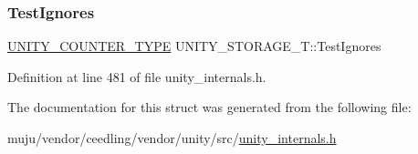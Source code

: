 \mbox{\label{struct_u_n_i_t_y___s_t_o_r_a_g_e___t_ab0ea61a39989b54885e805e6a35ff300}} 
\subsubsection{\texorpdfstring{Test\+Ignores}{TestIgnores}}
{\footnotesize\ttfamily \hyperlink{unity__internals_8h_ab5186738706785ae0189b382e45911d9}{U\+N\+I\+T\+Y\+\_\+\+C\+O\+U\+N\+T\+E\+R\+\_\+\+T\+Y\+PE} U\+N\+I\+T\+Y\+\_\+\+S\+T\+O\+R\+A\+G\+E\+\_\+\+T\+::\+Test\+Ignores}



Definition at line 481 of file unity\+\_\+internals.\+h.



The documentation for this struct was generated from the following file\+:\begin{DoxyCompactItemize}
\item 
muju/vendor/ceedling/vendor/unity/src/\hyperlink{unity__internals_8h}{unity\+\_\+internals.\+h}\end{DoxyCompactItemize}
